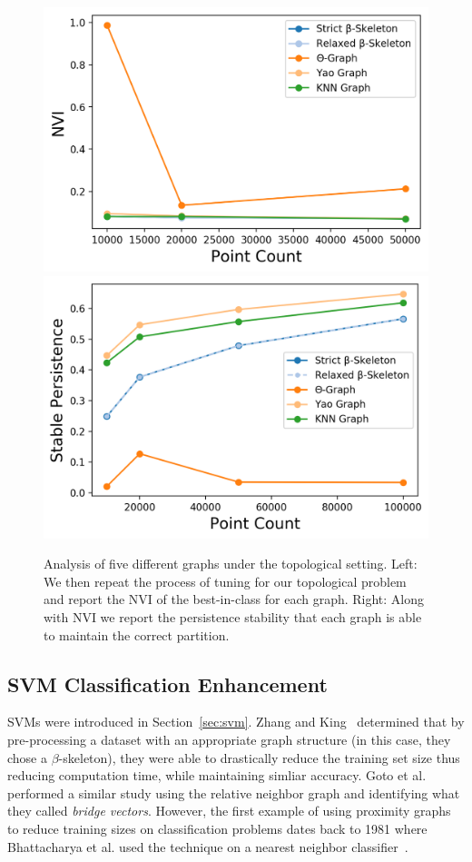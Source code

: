 \begin{figure}
    \includegraphics[width=0.48\linewidth]{figs/chap7/diagonal_4_nvi.png}
    \includegraphics[width=0.48\linewidth]{figs/chap7/diagonal_4_stability.png}
    \caption{Analysis of five different graphs  under the topological setting.
    Left: We then repeat the process of tuning for our topological problem and report the NVI of the best-in-class for each graph.
    Right: Along with NVI we report the persistence stability that each graph is able to maintain the correct partition.}
    \label{fig:graph_topo}
\end{figure}

\subsection{SVM Classification Enhancement}

SVMs were introduced in Section~\ref{sec:svm}.
%
Zhang and King~\cite{ZhangKing2002a, ZhangKing2002b} determined that by pre-processing a dataset with an appropriate graph structure (in this case, they chose a $\beta$-skeleton), they were able to drastically reduce the training set size thus reducing computation time, while maintaining simliar accuracy.
%
Goto et al.~\cite{GotoIshidaUchida2015} performed a similar study using the relative neighbor graph and identifying what they called \textit{bridge vectors}.
%
However, the first example of using proximity graphs to reduce training sizes on classification problems dates back to 1981 where Bhattacharya et al. used the technique on a nearest neighbor classifier~\cite{BhattacharyaPoulsenToussaint1981}.

